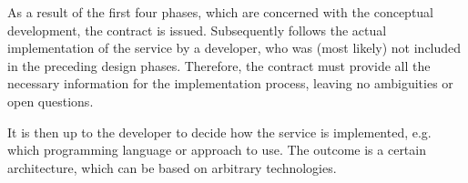 
As a result of the first four phases, which are concerned with the conceptual development, the contract is issued. Subsequently follows the actual implementation of the service by a developer, who was (most likely) not included in the preceding design phases. Therefore, the contract must provide all the necessary information for the implementation process, leaving no ambiguities or open questions.

It is then up to the developer to decide how the service is implemented, e.g. which programming language or approach to use. The outcome is a certain architecture, which can be based on arbitrary technologies. 
